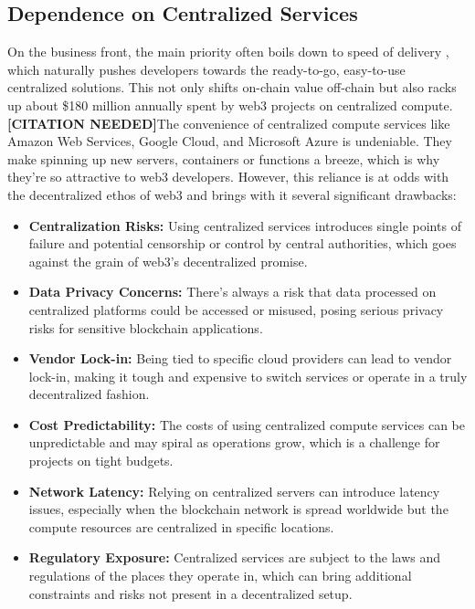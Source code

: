 \documentclass[11pt]{article}
\newcommand{\needcite}{\textbf{\color{red}[CITATION NEEDED]}}
\begin{document}
\subsection{Dependence on Centralized Services}
On the business front, the main priority often boils down to speed of delivery \parencite{elliot2014devops}, which naturally pushes developers towards the ready-to-go, easy-to-use centralized solutions. This not only shifts on-chain value off-chain but also racks up about \$180 million annually spent by web3 projects on centralized compute.\needcite The convenience of centralized compute services like Amazon Web Services, Google Cloud, and Microsoft Azure is undeniable. They make spinning up new servers, containers or functions a breeze, which is why they're so attractive to web3 developers. However, this reliance is at odds with the decentralized ethos of web3 and brings with it several significant drawbacks:
\begin{itemize}
  \item \textbf{Centralization Risks:} Using centralized services introduces single points of failure and potential censorship or control by central authorities, which goes against the grain of web3's decentralized promise. \parencite{nakamoto2008bitcoin}
  \item \textbf{Data Privacy Concerns:} There's always a risk that data processed on centralized platforms could be accessed or misused, posing serious privacy risks for sensitive blockchain applications. \parencite{zyskind2015decentralizing}
  \item \textbf{Vendor Lock-in:} Being tied to specific cloud providers can lead to vendor lock-in, making it tough and expensive to switch services or operate in a truly decentralized fashion. \parencite{armbrust2010view}
  \item \textbf{Cost Predictability:} The costs of using centralized compute services can be unpredictable and may spiral as operations grow, which is a challenge for projects on tight budgets. \parencite{vaquero2014finding}
  \item \textbf{Network Latency:} Relying on centralized servers can introduce latency issues, especially when the blockchain network is spread worldwide but the compute resources are centralized in specific locations. \parencite{bonomi2012fog}
  \item \textbf{Regulatory Exposure:} Centralized services are subject to the laws and regulations of the places they operate in, which can bring additional constraints and risks not present in a decentralized setup. \parencite[see Chapters 7 and 10]{lessig1999code}
\end{itemize}
\end{document}
